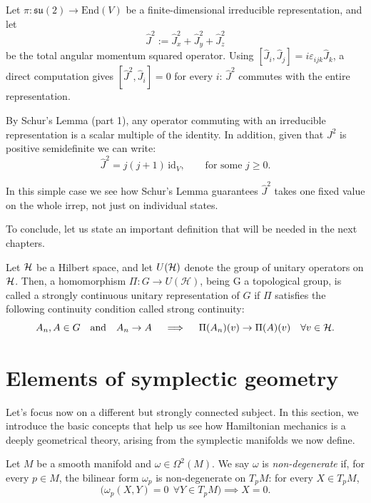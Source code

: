 \begin{example}
	Let $\pi: \mathfrak{su}(2) \to \mathrm{End}(V)$ be a finite-dimensional irreducible representation, and let
	\[
	\hat J^2 := \hat J_x^2 + \hat J_y^2 + \hat J_z^2
	\]
	be the total angular momentum squared operator. Using $[\hat J_i, \hat J_j] = i\varepsilon_{ijk}\hat J_k$, a direct computation gives $[\hat J^2, \hat J_i] = 0$ for every $i$: $\hat J^2$ commutes with the entire representation.
	
	By Schur's Lemma (part 1), any operator commuting with an irreducible representation is a scalar multiple of the identity. In addition, given that $J^2$ is positive semidefinite we can write:
	\[
	\hat J^2 = j(j+1)\, \mathrm{id}_V, \qquad \text{for some } j \geq 0.
	\]
	
	In this simple case we see how Schur's Lemma guarantees $\hat J^2$ takes one fixed value on the whole irrep, not just on individual states.
\end{example}

To conclude, let us state an important definition that will be needed in the next chapters.

\begin{definition} \label{def:rep-scur}
	Let $\H$ be a Hilbert space, and let $U(\H)$ denote the group of unitary operators on $\H$. Then, a homomorphism $\Pi \colon G \to U(\mathcal{H})$, being G a topological group, is called a strongly continuous unitary representation of $G$ if $\Pi$ satisfies the following continuity condition called strong continuity: 
	\[
 		A_n, A \in G \quad \text{and} \quad  A_n \to A \quad \implies \quad \Pi(A_n) (v) \to \Pi(A) (v) \quad \forall v \in \H.
 	\] 
\end{definition}

\section{Elements of symplectic geometry}

Let's focus now on a different but strongly connected subject. In this section, we introduce the basic concepts that help us see how Hamiltonian mechanics is a deeply geometrical theory, arising from the symplectic manifolds we now define.

\begin{definition}\label{def:non-deg}
	Let $M$ be a smooth manifold and $\omega \in \Omega^2(M)$. We say $\omega$ is \emph{non-degenerate} if, for every $p \in M$, the bilinear form $\omega_p$ is non-degenerate on $T_pM$: for every $X \in T_pM$,
	\[
	\big(\omega_p(X,Y) = 0 \ \ \forall Y \in T_pM\big) \implies X = 0.
	\]
\end{definition}

